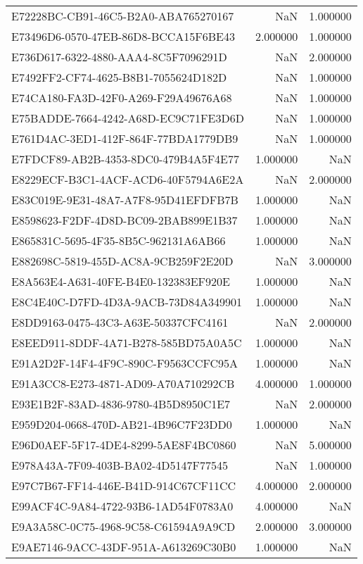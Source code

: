 \begin{tabular}{lrr}
E72228BC-CB91-46C5-B2A0-ABA765270167 & NaN & 1.000000 \\
E73496D6-0570-47EB-86D8-BCCA15F6BE43 & 2.000000 & 1.000000 \\
E736D617-6322-4880-AAA4-8C5F7096291D & NaN & 2.000000 \\
E7492FF2-CF74-4625-B8B1-7055624D182D & NaN & 1.000000 \\
E74CA180-FA3D-42F0-A269-F29A49676A68 & NaN & 1.000000 \\
E75BADDE-7664-4242-A68D-EC9C71FE3D6D & NaN & 1.000000 \\
E761D4AC-3ED1-412F-864F-77BDA1779DB9 & NaN & 1.000000 \\
E7FDCF89-AB2B-4353-8DC0-479B4A5F4E77 & 1.000000 & NaN \\
E8229ECF-B3C1-4ACF-ACD6-40F5794A6E2A & NaN & 2.000000 \\
E83C019E-9E31-48A7-A7F8-95D41EFDFB7B & 1.000000 & NaN \\
E8598623-F2DF-4D8D-BC09-2BAB899E1B37 & 1.000000 & NaN \\
E865831C-5695-4F35-8B5C-962131A6AB66 & 1.000000 & NaN \\
E882698C-5819-455D-AC8A-9CB259F2E20D & NaN & 3.000000 \\
E8A563E4-A631-40FE-B4E0-132383EF920E & 1.000000 & NaN \\
E8C4E40C-D7FD-4D3A-9ACB-73D84A349901 & 1.000000 & NaN \\
E8DD9163-0475-43C3-A63E-50337CFC4161 & NaN & 2.000000 \\
E8EED911-8DDF-4A71-B278-585BD75A0A5C & 1.000000 & NaN \\
E91A2D2F-14F4-4F9C-890C-F9563CCFC95A & 1.000000 & NaN \\
E91A3CC8-E273-4871-AD09-A70A710292CB & 4.000000 & 1.000000 \\
E93E1B2F-83AD-4836-9780-4B5D8950C1E7 & NaN & 2.000000 \\
E959D204-0668-470D-AB21-4B96C7F23DD0 & 1.000000 & NaN \\
E96D0AEF-5F17-4DE4-8299-5AE8F4BC0860 & NaN & 5.000000 \\
E978A43A-7F09-403B-BA02-4D5147F77545 & NaN & 1.000000 \\
E97C7B67-FF14-446E-B41D-914C67CF11CC & 4.000000 & 2.000000 \\
E99ACF4C-9A84-4722-93B6-1AD54F0783A0 & 4.000000 & NaN \\
E9A3A58C-0C75-4968-9C58-C61594A9A9CD & 2.000000 & 3.000000 \\
E9AE7146-9ACC-43DF-951A-A613269C30B0 & 1.000000 & NaN \\

\end{tabular}

